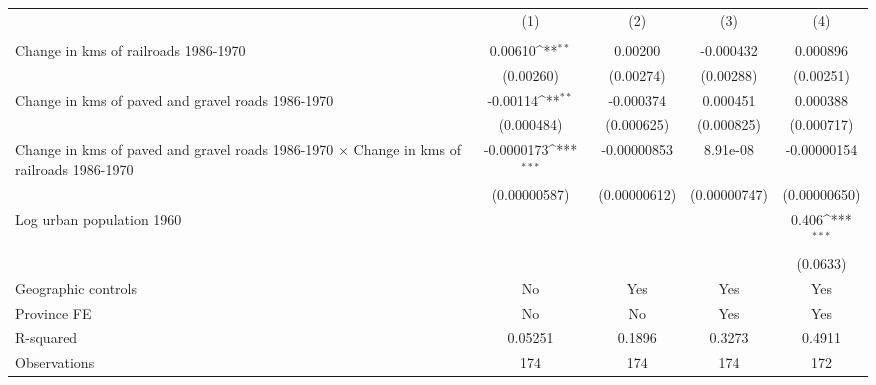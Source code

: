 {
\def\sym#1{\ifmmode^{#1}\else\(^{#1}\)\fi}
\begin{tabular}{l*{4}{c}}
\hline\hline
                &\multicolumn{1}{c}{(1)}&\multicolumn{1}{c}{(2)}&\multicolumn{1}{c}{(3)}&\multicolumn{1}{c}{(4)}\\
                &\multicolumn{1}{c}{}&\multicolumn{1}{c}{}&\multicolumn{1}{c}{}&\multicolumn{1}{c}{}\\
\hline
Change in kms of railroads 1986-1970&  0.00610\sym{**} &  0.00200         &-0.000432         & 0.000896         \\
                &(0.00260)         &(0.00274)         &(0.00288)         &(0.00251)         \\
[1em]
Change in kms of paved and gravel roads 1986-1970& -0.00114\sym{**} &-0.000374         & 0.000451         & 0.000388         \\
                &(0.000484)         &(0.000625)         &(0.000825)         &(0.000717)         \\
[1em]
Change in kms of paved and gravel roads 1986-1970 $\times$ Change in kms of railroads 1986-1970&-0.0000173\sym{***}&-0.00000853         & 8.91e-08         &-0.00000154         \\
                &(0.00000587)         &(0.00000612)         &(0.00000747)         &(0.00000650)         \\
[1em]
Log urban population 1960&                  &                  &                  &    0.406\sym{***}\\
                &                  &                  &                  & (0.0633)         \\
\hline
Geographic controls&       No         &      Yes         &      Yes         &      Yes         \\
Province FE     &       No         &       No         &      Yes         &      Yes         \\
R-squared       &  0.05251         &   0.1896         &   0.3273         &   0.4911         \\
Observations    &      174         &      174         &      174         &      172         \\
\hline\hline
\end{tabular}
}
